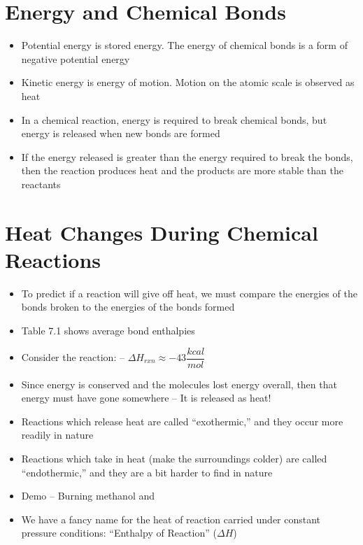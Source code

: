 \documentclass[12pt, openany, letterpaper]{memoir}
\begin{document}
\section{Energy and Chemical Bonds}
\begin{itemize}
	\item Potential energy is stored energy. The energy of chemical bonds is a form of negative potential energy
	\item Kinetic energy is energy of motion. Motion on the atomic scale is observed as heat
	\item In a chemical reaction, energy is required to break chemical bonds, but energy is released when new bonds are formed
	\item If the energy released is greater than the energy required to break the bonds, then the reaction produces heat and the products are more stable than the reactants
\end{itemize}
\section{Heat Changes During Chemical Reactions}
\begin{itemize}
	\item To predict if a reaction will give off heat, we must compare the energies of the bonds broken to the energies of the bonds formed
	\item Table 7.1 shows average bond enthalpies
	\item Consider the reaction:  -- $\Delta H_{rxn}\approx-43\dfrac{kcal}{mol}$
	\item Since energy is conserved and the molecules lost energy overall, then that energy must have gone somewhere -- It is released as heat!
	\item Reactions which release heat are called ``exothermic,'' and they occur more readily in nature
	\item Reactions which take in heat (make the surroundings colder) are called ``endothermic,'' and they are a bit harder to find in nature
	\item Demo -- Burning methanol and 
	\item We have a fancy name for the heat of reaction carried under constant pressure conditions: ``Enthalpy of Reaction'' ($\Delta H$)
\end{itemize}
\end{document}

